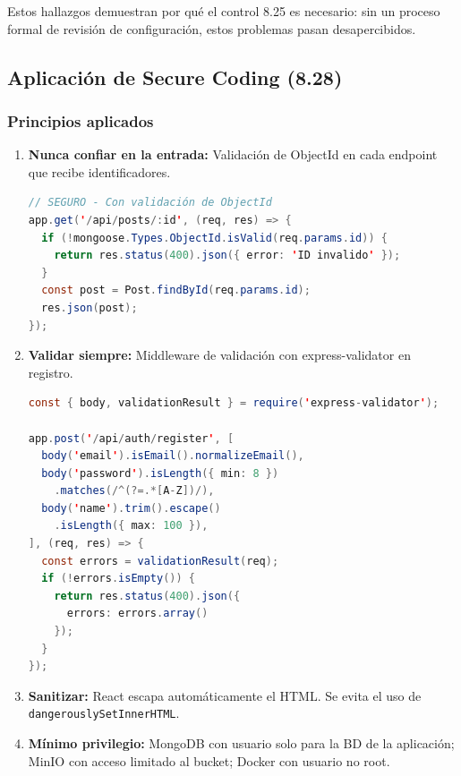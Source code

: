 Estos hallazgos demuestran por qué el control 8.25 es necesario: sin un proceso formal de revisión de configuración, estos problemas pasan desapercibidos.

\subsection{Aplicación de Secure Coding (8.28)}

\subsubsection{Principios aplicados}

\begin{enumerate}
    \item \textbf{Nunca confiar en la entrada:} Validación de ObjectId en cada endpoint que recibe identificadores.

    \begin{lstlisting}[language=Java, caption={Validación de ObjectId}]
// SEGURO - Con validación de ObjectId
app.get('/api/posts/:id', (req, res) => {
  if (!mongoose.Types.ObjectId.isValid(req.params.id)) {
    return res.status(400).json({ error: 'ID invalido' });
  }
  const post = Post.findById(req.params.id);
  res.json(post);
});
    \end{lstlisting}

    \item \textbf{Validar siempre:} Middleware de validación con express-validator en registro.

    \begin{lstlisting}[language=Java, caption={Middleware de validación}]
const { body, validationResult } = require('express-validator');

app.post('/api/auth/register', [
  body('email').isEmail().normalizeEmail(),
  body('password').isLength({ min: 8 })
    .matches(/^(?=.*[A-Z])/),
  body('name').trim().escape()
    .isLength({ max: 100 }),
], (req, res) => {
  const errors = validationResult(req);
  if (!errors.isEmpty()) {
    return res.status(400).json({
      errors: errors.array()
    });
  }
});
    \end{lstlisting}

    \item \textbf{Sanitizar:} React escapa automáticamente el HTML. Se evita el uso de \texttt{dangerouslySetInnerHTML}.

    \item \textbf{Mínimo privilegio:} MongoDB con usuario solo para la BD de la aplicación; MinIO con acceso limitado al bucket; Docker con usuario no root.


\end{enumerate}
